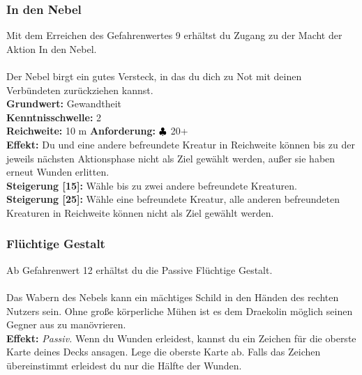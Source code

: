 \subsubsection*{ In den Nebel} \label{sk:in_den_nebel}
Mit dem Erreichen des Gefahrenwertes 9 erhältst du Zugang zu der Macht der Aktion In den Nebel.\\
\\
Der Nebel birgt ein gutes Versteck, in das du dich zu Not mit deinen Verbündeten zurückziehen kannst.  \\
\textbf{Grundwert:} Gewandtheit \\
\textbf{Kenntnisschwelle:} 2 \\
\textbf{Reichweite:} 10 m
\textbf{Anforderung:} ${\color{blue} }{\color{black}\clubsuit}$ 20+ \\
\textbf{Effekt:} Du und eine andere befreundete Kreatur in Reichweite können bis zu der jeweils nächsten Aktionsphase nicht als Ziel gewählt werden, außer sie haben erneut Wunden erlitten.\\
\textbf{Steigerung [15]:} Wähle bis zu zwei andere befreundete Kreaturen.\\
\textbf{Steigerung [25]:} Wähle eine befreundete Kreatur, alle anderen befreundeten Kreaturen in Reichweite können nicht als Ziel gewählt werden.

\subsubsection*{ Flüchtige Gestalt} \label{sk:verschwindende_gestalt}
Ab Gefahrenwert 12 erhältst du die Passive Flüchtige Gestalt.\\
\\
Das Wabern des Nebels kann ein mächtiges Schild in den Händen des rechten Nutzers sein. Ohne große körperliche Mühen ist es dem Draekolin möglich seinen Gegner aus zu manövrieren.  \\
\textbf{Effekt:} \textit{Passiv.} Wenn du Wunden erleidest, kannst du ein Zeichen für die oberste Karte deines Decks ansagen. Lege die oberste Karte ab. Falls das Zeichen übereinstimmt erleidest du nur die Hälfte der Wunden.\\

